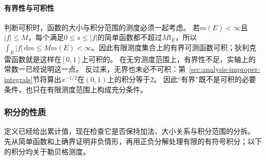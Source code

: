 \paragraph{有界性与可积性}
判断可积时，函数的大小与积分范围的测度必须一起考虑。
若$m(E)<\infty$且$|f|\leq M$，每个满足$0\leq s\leq|f|$的简单函数都不超过$M\mathbb I_E$，所以$\int_E|f|\,\mathrm dm\leq Mm(E)<\infty$。因此有限测度集合上的有界可测函数可积；狄利克雷函数就是这样在$[0,1]$上可积的。
在无穷测度范围上，有界性不足，实轴上的常数一已经说明这一点。
反过来，无界也未必不可积：第~\ref{sec:analysis-improper-integrals}节将算出$x^{-1/2}$在$(0,1)$上的积分等于$2$。
因此“有界”既不是可积的必要条件，也只在有限测度范围上构成充分条件。

\subsubsection{积分的性质}
\label{sec:analysis-lebesgue-basic-properties}

定义已经给出累计值，现在检查它是否保持加法、大小关系与积分范围的分拆。
先从简单函数和上确界证明非负情形，再用正负分解处理有限的有符号积分；以下的积分均关于勒贝格测度。

